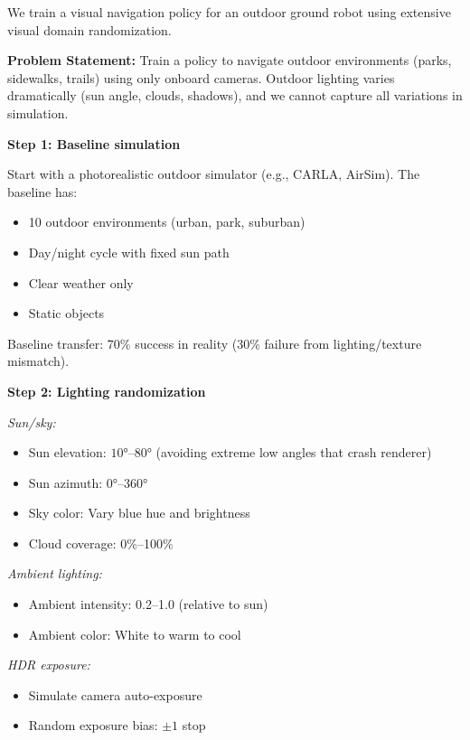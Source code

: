 \begin{example}
\label{ex:outdoor_visual_rand}
We train a visual navigation policy for an outdoor ground robot using extensive visual domain randomization.

\textbf{Problem Statement:}
Train a policy to navigate outdoor environments (parks, sidewalks, trails) using only onboard cameras. Outdoor lighting varies dramatically (sun angle, clouds, shadows), and we cannot capture all variations in simulation.

\textbf{Step 1: Baseline simulation}

Start with a photorealistic outdoor simulator (e.g., CARLA, AirSim). The baseline has:
\begin{itemize}
    \item 10 outdoor environments (urban, park, suburban)
    \item Day/night cycle with fixed sun path
    \item Clear weather only
    \item Static objects
\end{itemize}

Baseline transfer: 70\% success in reality (30\% failure from lighting/texture mismatch).

\textbf{Step 2: Lighting randomization}

\textit{Sun/sky:}
\begin{itemize}
    \item Sun elevation: $10°$--$80°$ (avoiding extreme low angles that crash renderer)
    \item Sun azimuth: $0°$--$360°$
    \item Sky color: Vary blue hue and brightness
    \item Cloud coverage: 0\%--100\%
\end{itemize}

\textit{Ambient lighting:}
\begin{itemize}
    \item Ambient intensity: 0.2--1.0 (relative to sun)
    \item Ambient color: White to warm to cool
\end{itemize}

\textit{HDR exposure:}
\begin{itemize}
    \item Simulate camera auto-exposure
    \item Random exposure bias: $\pm 1$ stop
\end{itemize}


\end{example}
